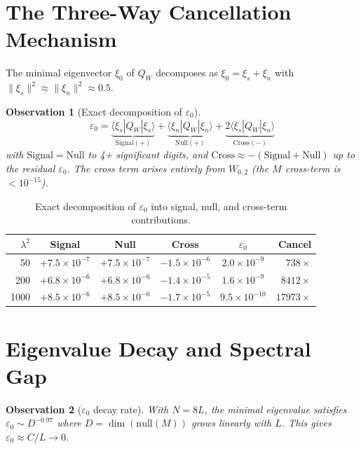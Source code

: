 \documentclass[11pt,a4paper]{article}
\newtheorem{observation}{Observation}[section]
\begin{document}
\section{The Three-Way Cancellation Mechanism}

The minimal eigenvector $\xi_0$ of $Q_W$ decomposes as $\xi_0 = \xi_s + \xi_n$ with $\|\xi_s\|^2 \approx \|\xi_n\|^2 \approx 0.5$.

\begin{observation}[Exact decomposition of $\varepsilon_0$]
\[
\varepsilon_0 = \underbrace{\langle \xi_s | Q_W | \xi_s \rangle}_{\text{Signal}(+)} + \underbrace{\langle \xi_n | Q_W | \xi_n \rangle}_{\text{Null}(+)} + \underbrace{2\langle \xi_s | Q_W | \xi_n \rangle}_{\text{Cross}(-)}
\]
with $\mathrm{Signal} = \mathrm{Null}$ to 4+ significant digits, and $\mathrm{Cross} \approx -(\mathrm{Signal} + \mathrm{Null})$ up to the residual $\varepsilon_0$. The cross term arises entirely from $W_{0,2}$ (the $M$ cross-term is $< 10^{-15}$).
\end{observation}

\begin{table}[h]
\centering
\begin{tabular}{rccccr}
\toprule
$\lambda^2$ & Signal & Null & Cross & $\varepsilon_0$ & Cancel \\
\midrule
50 & $+7.5 \times 10^{-7}$ & $+7.5 \times 10^{-7}$ & $-1.5 \times 10^{-6}$ & $2.0 \times 10^{-9}$ & $738\times$ \\
200 & $+6.8 \times 10^{-6}$ & $+6.8 \times 10^{-6}$ & $-1.4 \times 10^{-5}$ & $1.6 \times 10^{-9}$ & $8412\times$ \\
1000 & $+8.5 \times 10^{-6}$ & $+8.5 \times 10^{-6}$ & $-1.7 \times 10^{-5}$ & $9.5 \times 10^{-10}$ & $17973\times$ \\
\bottomrule
\end{tabular}
\caption{Exact decomposition of $\varepsilon_0$ into signal, null, and cross-term contributions.}
\end{table}

\section{Eigenvalue Decay and Spectral Gap}

\begin{observation}[$\varepsilon_0$ decay rate]
With $N = 8L$, the minimal eigenvalue satisfies $\varepsilon_0 \sim D^{-0.97}$ where $D = \dim(\mathrm{null}(M))$ grows linearly with $L$. This gives $\varepsilon_0 \approx C/L \to 0$.
\end{observation}
\end{document}
